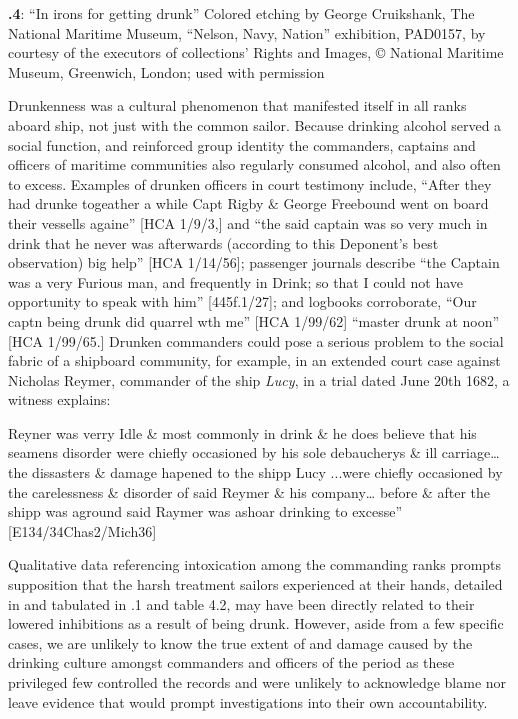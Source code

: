  

\textbf{.4}: “In irons for getting drunk” Colored etching by George Cruikshank, The National Maritime Museum, “Nelson, Navy, Nation” exhibition, PAD0157, by courtesy of the executors of collections’ Rights and Images, © National Maritime Museum, Greenwich, London; used with permission

Drunkenness was a cultural phenomenon that manifested itself in all ranks aboard ship, not just with the common sailor. Because drinking alcohol served a social function, and reinforced group identity \citep[13,]{Fury2015} the commanders, captains and officers of maritime communities also regularly consumed alcohol, and also often to excess. Examples of drunken officers in court testimony include, “After they had drunke togeather a while Capt Rigby \& George Freebound went on board their vessells againe” [HCA 1/9/3,] and “the said captain was so very much in drink that he never was afterwards (according to this Deponent’s best observation) big help” [HCA 1/14/56]; passenger journals describe “the Captain was a very Furious man, and frequently in Drink; so that I could not have opportunity to speak with him” [445f.1/27]; and logbooks corroborate, “Our captn being drunk did quarrel wth me” [HCA 1/99/62] “master drunk at noon” [HCA 1/99/65.] Drunken commanders could pose a serious problem to the social fabric of a shipboard community, for example, in an extended court case against Nicholas Reymer, commander of the ship \textit{Lucy}, in a trial dated June 20th 1682, a witness explains:

Reyner was verry Idle \& most commonly in drink \& he does believe that his seamens disorder were chiefly occasioned by his sole debaucherys \& ill carriage… the dissasters \& damage hapened to the shipp Lucy ...were chiefly occasioned by the carelessness \& disorder of said Reymer \& his company… before \& after the shipp was aground said Raymer was ashoar drinking to excesse”  [E134/34Chas2/Mich36]

Qualitative data referencing intoxication among the commanding ranks prompts supposition that the harsh treatment sailors experienced at their hands, detailed in  and tabulated in .1 and table 4.2, may have been directly related to their lowered inhibitions as a result of being drunk. However, aside from a few specific cases, we are unlikely to know the true extent of and damage caused by the drinking culture amongst commanders and officers of the period as these privileged few controlled the records and were unlikely to acknowledge blame nor leave evidence that would prompt investigations into their own accountability.

